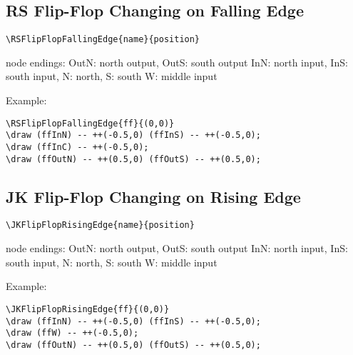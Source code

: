 \documentclass[parskip=full]{scrartcl}
\begin{document}
\subsection{RS Flip-Flop Changing on Falling Edge}

\begin{verbatim}
\RSFlipFlopFallingEdge{name}{position}
\end{verbatim}
node endings: OutN: north output, OutS: south output
              InN: north input, InS: south input,
              N: north, S: south
              W: middle input

Example:\\
\begin{minipage}{0.8\textwidth}
\begin{verbatim}
\RSFlipFlopFallingEdge{ff}{(0,0)}
\draw (ffInN) -- ++(-0.5,0) (ffInS) -- ++(-0.5,0);
\draw (ffInC) -- ++(-0.5,0);
\draw (ffOutN) -- ++(0.5,0) (ffOutS) -- ++(0.5,0);
\end{verbatim}
\end{minipage}
\begin{minipage}{0.19\textwidth}
\end{minipage}

\subsection{JK Flip-Flop Changing on Rising Edge}

\begin{verbatim}
\JKFlipFlopRisingEdge{name}{position}
\end{verbatim}
node endings: OutN: north output, OutS: south output
              InN: north input, InS: south input,
              N: north, S: south
              W: middle input

Example:\\
\begin{minipage}{0.8\textwidth}
\begin{verbatim}
\JKFlipFlopRisingEdge{ff}{(0,0)}
\draw (ffInN) -- ++(-0.5,0) (ffInS) -- ++(-0.5,0);
\draw (ffW) -- ++(-0.5,0);
\draw (ffOutN) -- ++(0.5,0) (ffOutS) -- ++(0.5,0);
\end{verbatim}
\end{minipage}
\begin{minipage}{0.19\textwidth}
\end{minipage}
\end{document}
